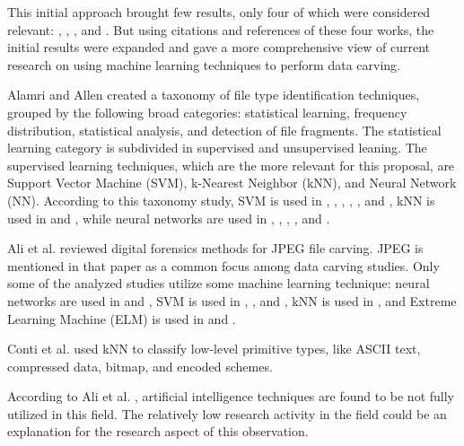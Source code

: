 This initial approach brought few results, only four of which were considered relevant: \cite{alamri_taxonomy_2014}, 
\cite{ali_review_2018}, \cite{sportiello_context-based_2012}, and \cite{beebe_sceadan:_2013}. But using citations and references of these four works, the initial results were expanded and gave a more comprehensive view of current research on using machine learning techniques to perform data carving.

Alamri and Allen \cite{alamri_taxonomy_2014} created a taxonomy of file type identification techniques, grouped by the following broad categories: statistical learning, frequency distribution, statistical analysis, and detection of file fragments. The statistical learning category is subdivided in supervised and unsupervised leaning. The supervised learning techniques, which are the more relevant for this proposal, are Support Vector Machine (SVM), k-Nearest Neighbor (kNN), and Neural Network (NN). According to this taxonomy study, SVM is used in \cite{ahmed_fast_2011}, \cite{amirani_feature-based_2013}, \cite{beebe_sceadan:_2013}, \cite{fitzgerald_using_2012}, \cite{gopal_statistical_2011}, and \cite{sportiello_context-based_2012}, kNN is used in \cite{ahmed_fast_2011} and \cite{gopal_statistical_2011}, while neural networks are used in \cite{ahmed_fast_2011}, \cite{ahmed_content-based_2010}, \cite{amirani_new_2008}, \cite{amirani_feature-based_2013}, and \cite{penrose_approaches_2013}.

Ali et al. \cite{ali_review_2018} reviewed digital forensics methods for JPEG file carving. JPEG is mentioned in that paper as a common focus among data carving studies. Only some of the analyzed studies utilize some machine learning technique:
neural networks are used in \cite{xu_reassembling_2009} and \cite{amirani_feature-based_2013},
SVM is used in \cite{qiu_new_2014}, \cite{zhang_svm_2016}, and \cite{sportiello_file_2011},
kNN is used in \cite{axelsson_normalised_2010},
and Extreme Learning Machine (ELM) is used in \cite{zhang_svm_2016} and \cite{ali_classification_2018}.


Conti et al. \cite{conti_automated_2010} used kNN to classify low-level primitive types, like ASCII text, compressed data, bitmap, and encoded schemes.

According to Ali et al. \cite{ali_review_2018}, artificial intelligence techniques are found to be not fully utilized in this field. The relatively low research activity in the field could be an explanation for the research aspect of this observation.

